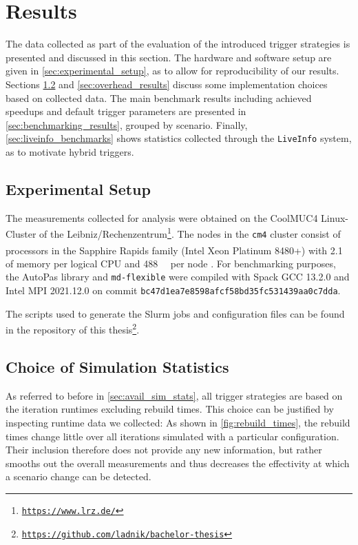 \chapter[Results]{Results}
\label{cp:results}

{
	\parindent0pt
	The data collected as part of the evaluation of the introduced trigger strategies is presented and discussed in this section. The hardware and software setup are given in \autoref{sec:experimental_setup}, as to allow for reproducibility of our results. Sections \ref{sec:justification_rebuild} and \ref{sec:overhead_results} discuss some implementation choices based on collected data. The main benchmark results including achieved speedups and default trigger parameters are presented in \autoref{sec:benchmarking_results}, grouped by scenario. Finally, \autoref{sec:liveinfo_benchmarks} shows statistics collected through the \texttt{LiveInfo} system, as to motivate hybrid triggers.
}


\section{Experimental Setup}
\label{sec:experimental_setup}
The measurements collected for analysis were obtained on the CoolMUC4 Linux-Cluster of the Leibniz\-/Rechenzentrum\footnote{\href{https://www.lrz.de/}{\texttt{https://www.lrz.de/}}}. The nodes in the \texttt{cm4} cluster consist of processors in the Sapphire Rapids family (Intel\textsuperscript{\textregistered} Xeon\textsuperscript{\textregistered} Platinum 8480+)  with \qty{2.1}{\gibi \byte} of memory per logical CPU and \qty{488}{\gibi \byte} per node \cite{LSC2025}. For benchmarking purposes, the AutoPas library and \texttt{md-flexible} were compiled with Spack GCC 13.2.0 and Intel MPI 2021.12.0 on commit \texttt{bc47d1ea7e8598afcf58bd35fc531439aa0c7dda}.

The scripts used to generate the Slurm jobs and configuration files can be found in the repository of this thesis\footnote{\href{https://github.com/ladnik/bachelor-thesis}{\texttt{https://github.com/ladnik/bachelor-thesis}}}.


\section{Choice of Simulation Statistics}
\label{sec:justification_rebuild}
As referred to before in \autoref{sec:avail_sim_stats}, all trigger strategies are based on the iteration runtimes excluding rebuild times. This choice can be justified by inspecting runtime data we collected: As shown  in \autoref{fig:rebuild_times}, the rebuild times change little over all iterations simulated with a particular configuration. Their inclusion therefore does not provide any new information, but rather smooths out the overall measurements and thus decreases the effectivity at which a scenario change can be detected.

